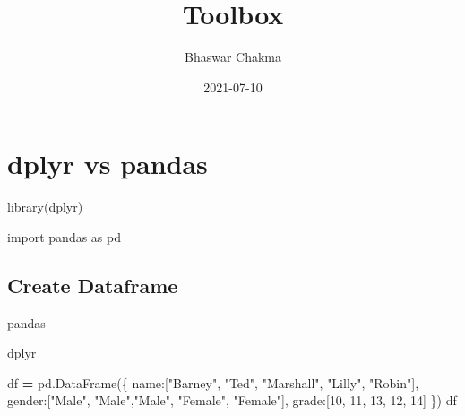 \documentclass[
]{book}
\title{Toolbox}
\author{Bhaswar Chakma}
\date{2021-07-10}
\newenvironment{Shaded}{\begin{snugshade}}{\end{snugshade}}
\newcommand{\DecValTok}[1]{\textcolor[rgb]{0.00,0.00,0.81}{#1}}
\newcommand{\FunctionTok}[1]{\textcolor[rgb]{0.00,0.00,0.00}{#1}}
\newcommand{\ImportTok}[1]{#1}
\newcommand{\NormalTok}[1]{#1}
\newcommand{\OperatorTok}[1]{\textcolor[rgb]{0.81,0.36,0.00}{\textbf{#1}}}
\newcommand{\StringTok}[1]{\textcolor[rgb]{0.31,0.60,0.02}{#1}}
\begin{document}
\maketitle

{
\setcounter{tocdepth}{1}
\tableofcontents
}
\hypertarget{section}{%
\chapter*{}\label{section}}

\hypertarget{dplyr-vs-pandas}{%
\chapter{dplyr vs pandas}\label{dplyr-vs-pandas}}

\begin{Shaded}
\begin{Highlighting}[]
\FunctionTok{library}\NormalTok{(dplyr)}
\end{Highlighting}
\end{Shaded}

\begin{Shaded}
\begin{Highlighting}[]
\ImportTok{import}\NormalTok{ pandas }\ImportTok{as}\NormalTok{ pd}
\end{Highlighting}
\end{Shaded}

\hypertarget{create-dataframe}{%
\section{Create Dataframe}\label{create-dataframe}}

pandas

dplyr

\begin{Shaded}
\begin{Highlighting}[]
\NormalTok{df }\OperatorTok{=}\NormalTok{ pd.DataFrame(\{}
  \StringTok{\textquotesingle{}name\textquotesingle{}}\NormalTok{:[}\StringTok{"Barney"}\NormalTok{, }\StringTok{"Ted"}\NormalTok{, }\StringTok{"Marshall"}\NormalTok{, }\StringTok{"Lilly"}\NormalTok{, }\StringTok{"Robin"}\NormalTok{],}
  \StringTok{\textquotesingle{}gender\textquotesingle{}}\NormalTok{:[}\StringTok{"Male"}\NormalTok{, }\StringTok{"Male"}\NormalTok{,}\StringTok{"Male"}\NormalTok{, }\StringTok{"Female"}\NormalTok{, }\StringTok{"Female"}\NormalTok{],}
  \StringTok{\textquotesingle{}grade\textquotesingle{}}\NormalTok{:[}\DecValTok{10}\NormalTok{, }\DecValTok{11}\NormalTok{, }\DecValTok{13}\NormalTok{, }\DecValTok{12}\NormalTok{, }\DecValTok{14}\NormalTok{] }
\NormalTok{\})}
\NormalTok{df}
\end{Highlighting}
\end{Shaded}
\end{document}
